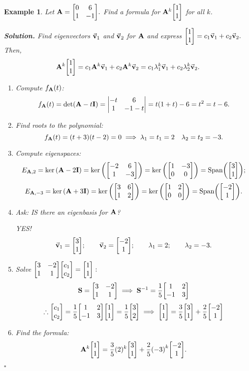 \documentclass[12pt, a4paper]{article}
\newtheorem{eg}{Example}[subsection]
\newenvironment*{sol}{\par\indent\textbf{\textit{Solution. }}}{\hfill{$\square$}\par}
\def\Span{\mathrm{Span}}
\def\vecv{\va{v}}
\def\matrixA{\vb{A}}
\def\matrixI{\vb{I}}
\def\matrixS{\vb{S}}
\begin{document}
\begin{eg}
	Let $\matrixA=\mqty[0&6\\1&-1].$ Find a formula for $\matrixA^k\mqty[1\\1]$ for all $k$.
	\begin{sol}
	Find eigenvectors $\vecv_1$ and $\vecv_2$ for $\matrixA$ and express $\mqty[1\\1]=c_1\vecv_1+c_2\vecv_2.$ Then, \[\matrixA^k\mqty[1\\1]=c_1\matrixA^k\vecv_1+c_2\matrixA^k\vecv_2=c_1\lambda_1^k\vecv_1+c_2\lambda_2^k\vecv_2.\]
	\begin{enumerate}
		\item Compute $f_{\matrixA}(t)$: \[f_{\matrixA}(t)=\det(\matrixA-t\matrixI)=\mqty|{-t&6\\1&-1-t}|=t(1+t)-6=t^2=t-6.\]
		\item Find roots to the polynomial: \[f_{\matrixA}(t)=(t+3)(t-2)=0\implies\lambda_1=t_1=2\quad\lambda_2=t_2=-3.\]
		\item Compute eigenspaces: \[E_{\matrixA,2}=\ker\qty(\matrixA-2\matrixI)=\ker\qty(\mqty[-2&6\\1&-3])=\ker\qty(\mqty[1&-3\\0&0])=\Span\qty(\mqty[3\\1]);\]\[E_{\matrixA,-3}=\ker\qty(\matrixA+3\matrixI)=\ker\qty(\mqty[3&6\\1&2])=\ker\qty(\mqty[1&2\\0&0])=\Span\qty(\mqty[-2\\1]).\]
		\item Ask: IS there an eigenbasis for $\matrixA$? \par YES! \[\vecv_1=\mqty[3\\1];\qquad\vecv_2=\mqty[-2\\1];\qquad\lambda_1=2;\qquad\lambda_2=-3.\]
		\item Solve $\mqty[3&-2\\1&1]\mqty[c_1\\c_2]=\mqty[1\\1]: $\[\matrixS=\mqty[3&-2\\1&1]\implies\matrixS^{-1}=\dfrac{1}{5}\mqty[1&2\\-1&3]\]\[\therefore\mqty[c_1\\c_2]=\dfrac{1}{5}\mqty[1&2\\-1&3]\mqty[1\\1]=\dfrac{1}{5}\mqty[3\\2]\implies\mqty[1\\1]=\dfrac{3}{5}\mqty[3\\1]+\dfrac{2}{5}\mqty[-2\\1]\]
		\item Find the formula: \[\matrixA^k\mqty[1\\1]=\dfrac{3}{5}(2)^k\mqty[3\\1]+\dfrac{2}{5}\qty(-3)^k\mqty[-2\\1].\]
	\end{enumerate}
	\end{sol}
\end{eg}
\end{document}
